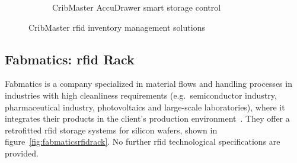 \begin{figure}[!ht]
\begin{subfigure}{.45\textwidth}
        \caption[CribMaster AccuDrawer smart storage control]{CribMaster AccuDrawer smart storage control~\cite{AccuDrawerCribmasterCom}} 
        \label{fig:cribmasteraccydrawer}
    \end{subfigure}
    \caption[CribMaster \ac{rfid} inventory management solutions]{CribMaster \ac{rfid} inventory management solutions}
    \label{fig:cribmaster}
\end{figure}

\subsection{Fabmatics: \ac{rfid} Rack}

Fabmatics is a company specialized in material flows and handling processes in industries with high cleanliness requirements (e.g.\ semiconductor industry, pharmaceutical industry, photovoltaics and large-scale laboratories), where it integrates their products in the client's production environment~\cite{RFIDRackFabmatics}.
They offer a retrofitted \ac{rfid} storage systems for silicon wafers, shown in figure~\ref{fig:fabmaticsrfidrack}.
No further \acs{rfid} technological specifications are provided.

